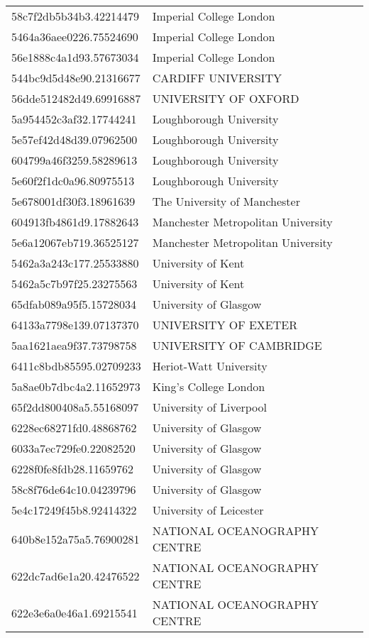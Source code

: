 \begin{tabular}{ll}
58c7f2db5b34b3.42214479 & Imperial College London \\
5464a36aee0226.75524690 & Imperial College London \\
56e1888c4a1d93.57673034 & Imperial College London \\
544bc9d5d48e90.21316677 & CARDIFF UNIVERSITY \\
56dde512482d49.69916887 & UNIVERSITY OF OXFORD \\
5a954452c3af32.17744241 & Loughborough University \\
5e57ef42d48d39.07962500 & Loughborough University \\
604799a46f3259.58289613 & Loughborough University \\
5e60f2f1dc0a96.80975513 & Loughborough University \\
5e678001df30f3.18961639 & The University of Manchester \\
604913fb4861d9.17882643 & Manchester Metropolitan University \\
5e6a12067eb719.36525127 & Manchester Metropolitan University \\
5462a3a243c177.25533880 & University of Kent \\
5462a5c7b97f25.23275563 & University of Kent \\
65dfab089a95f5.15728034 & University of Glasgow \\
64133a7798e139.07137370 & UNIVERSITY OF EXETER \\
5aa1621aea9f37.73798758 & UNIVERSITY OF CAMBRIDGE \\
6411c8bdb85595.02709233 & Heriot-Watt University \\
5a8ae0b7dbc4a2.11652973 & King's College London \\
65f2dd800408a5.55168097 & University of Liverpool \\
6228ec68271fd0.48868762 & University of Glasgow \\
6033a7ec729fe0.22082520 & University of Glasgow \\
6228f0fe8fdb28.11659762 & University of Glasgow \\
58c8f76de64c10.04239796 & University of Glasgow \\
5e4c17249f45b8.92414322 & University of Leicester \\
640b8e152a75a5.76900281 & NATIONAL OCEANOGRAPHY CENTRE \\
622dc7ad6e1a20.42476522 & NATIONAL OCEANOGRAPHY CENTRE \\
622e3e6a0e46a1.69215541 & NATIONAL OCEANOGRAPHY CENTRE \\

\end{tabular}
